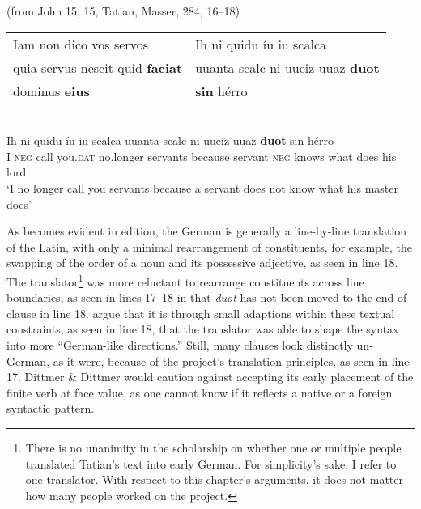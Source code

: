 \ea%
\label{ex:2:4}(from John 15, 15, Tatian, Masser, 284, 16--18)\medskip\\
\begin{tabular}{@{}ll@{}}
Iam non dico vos servos                  &    Ih ni quidu íu iu scalca                        \\
quia servus nescit quid \textbf{faciat}  &    uuanta scalc ni uueiz uuaz \textbf{duot}  \\
dominus \textbf{eius}                    &    \textbf{sin} hérro              \\
\end{tabular}\medskip\\
\gll Ih  ni    quidu  íu       iu       scalca     uuanta   scalc    ni    uueiz uuaz  \textbf{duot}  sin  hérro\\
I   \textsc{neg}   call   you.\textsc{dat}   no.longer   servants    because   servant  \textsc{neg}  knows what  does  his  lord \\
\glt ‘I no longer call you servants because a servant does not know what his master does’
\z

\noindent As becomes evident in  edition, the German is generally a line-by-line translation of the Latin, with only a minimal rearrangement of constituents, for example, the swapping of the order of a noun and its possessive adjective, as seen in line 18. The translator\footnote{{There is no unanimity in the scholarship on whether one or multiple people translated Tatian’s text into early German. For simplicity’s sake, I refer to one translator. With respect to this chapter’s arguments, it does not matter how many people worked on the project.} } was more reluctant to rearrange constituents across line boundaries, as seen in lines 17--18 in that \textit{duot} has not been moved to the end of clause in line 18. \citet[18--20]{DittmerDittmer1998} argue that it is through small adaptions within these textual constraints, as seen in line 18, that the translator was able to shape the syntax into more “German-like directions.” Still, many clauses look distinctly un-German, as it were, because of the project’s translation principles, as seen in line 17. Dittmer \& Dittmer would caution against accepting its early placement of the finite verb at face value, as one cannot know if it reflects a native or a foreign syntactic pattern.

